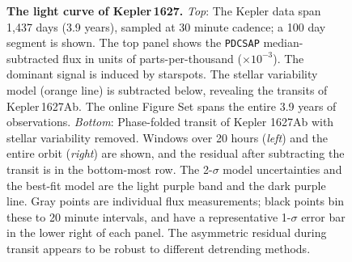 \documentclass[12pt,modern,twocolumn,tighten]{aastex63}
\newcommand{\pn}{Kepler\,1627Ab} %
\begin{document}
\begin{figure}[tp]
\begin{center}
		\vspace{-0.2cm}	
	\end{center}
	\vspace{-0.7cm}
  \caption{ {\bf The light curve of Kepler\,1627.}
    {\it Top}: 
    The Kepler data span 1{,}437 days (3.9 years), sampled at
    30 minute cadence;  a 100 day segment is shown.  The
    top panel shows the \texttt{PDCSAP} median-subtracted flux in
    units of parts-per-thousand ($\times 10^{-3}$).  The dominant
    signal is induced by starspots.  The stellar
    variability model (orange line) is subtracted below, revealing the
    transits of \pn.  The
    online Figure Set spans the entire 3.9 years of observations.
    {\it Bottom}:
    Phase-folded transit of Kepler 1627Ab with stellar variability
    removed.  Windows over 20 hours ({\it left}) and the entire orbit
    ({\it right}) are shown, and the residual after subtracting the
    transit is in the bottom-most row.  The 2-$\sigma$ model uncertainties
    and the best-fit model are the light purple band and the dark
    purple line.  Gray points are individual flux measurements; black
    points bin these to 20 minute intervals, and have a representative
    1-$\sigma$ error bar in the lower right of each panel.  The
    asymmetric residual during transit appears to be robust to
    different detrending methods.
    \label{fig:lc}
  }
\end{figure}
\end{document}
